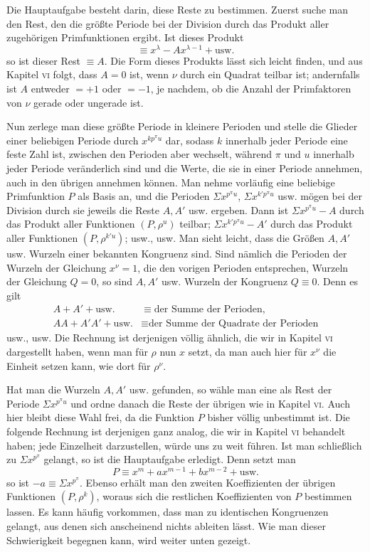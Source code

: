 Die Hauptaufgabe besteht darin, diese Reste zu bestimmen. Zuerst suche man den Rest, den die größte Periode bei der Division durch das Produkt aller zugehörigen Primfunktionen ergibt. Ist dieses Produkt
\[
\equiv x^\lambda-Ax^{\lambda-1}+\text{usw.}
\]
so ist dieser Rest $\equiv A$. Die Form dieses Produkts lässt sich leicht finden, und aus Kapitel \textsc{vi} folgt, dass $A=0$ ist, wenn $\nu$ durch ein Quadrat teilbar ist; andernfalls ist $A$ entweder $=+1$ oder $=-1$, je nachdem, ob die Anzahl der Primfaktoren von $\nu$ gerade oder ungerade ist.

Nun zerlege man diese größte Periode in kleinere Perioden und stelle die Glieder einer beliebigen Periode durch $x^{kp^\pi u}$ dar, sodass $k$ innerhalb jeder Periode eine
feste Zahl ist, zwischen den Perioden aber wechselt, während $\pi$ und $u$ innerhalb jeder Periode veränderlich sind und die Werte, die sie in einer Periode annehmen, auch in den übrigen annehmen können. Man nehme vorläufig eine beliebige Primfunktion $P$ als Basis an, und die Perioden $\Sigma x^{p^\pi u}$, $\Sigma x^{k'p^\pi u}$ usw. mögen bei der Division durch sie jeweils die Reste $A,A'$ usw. ergeben. Dann ist $\Sigma x^{p^\pi u}-A$ durch das Produkt aller Funktionen $(P,\rho^u)$ teilbar; $\Sigma x^{k'p^\pi u}-A'$ durch das Produkt aller Funktionen $(P,\rho^{k'u})$; usw., usw. Man sieht leicht, dass die Größen $A,A'$ usw. Wurzeln einer bekannten Kongruenz sind. Sind nämlich die Perioden der Wurzeln der Gleichung $x^\nu=1$, die den vorigen Perioden entsprechen, Wurzeln der Gleichung $Q=0$, so sind $A,A'$ usw. Wurzeln der Kongruenz $Q\equiv0$. Denn es gilt
\[
\begin{aligned}
A+A'+\text{usw.}&\equiv\text{der Summe der Perioden},\\
AA+A'A'+\text{usw.}&\equiv\text{der Summe der Quadrate der Perioden}
\end{aligned}
\]
usw., usw. Die Rechnung ist derjenigen völlig ähnlich, die wir in Kapitel \textsc{vi} dargestellt haben, wenn man für $\rho$ nun $x$ setzt, da man auch hier für $x^\nu$ die Einheit setzen kann, wie dort für $\rho^\nu$.

Hat man die Wurzeln $A,A'$ usw. gefunden, so wähle man eine als Rest der Periode $\Sigma x^{p^\pi u}$ und ordne danach die Reste der übrigen wie in Kapitel \textsc{vi}. Auch hier bleibt diese Wahl frei, da die Funktion $P$ bisher völlig unbestimmt ist. Die folgende Rechnung ist derjenigen ganz analog, die wir in Kapitel \textsc{vi} behandelt haben; jede Einzelheit darzustellen, würde uns zu weit führen. Ist man schließlich zu $\Sigma x^{p^\pi}$ gelangt, so ist die Hauptaufgabe erledigt. Denn setzt man
\[
P\equiv x^m+ax^{m-1}+bx^{m-2}+\text{usw.}
\]
so ist $-a\equiv\Sigma x^{p^\pi}$. Ebenso erhält man den zweiten Koeffizienten der übrigen Funktionen $(P,\rho^k)$, woraus sich die restlichen Koeffizienten von $P$ bestimmen lassen. Es kann häufig vorkommen, dass man zu identischen Kongruenzen gelangt, aus denen sich anscheinend nichts ableiten lässt. Wie man dieser Schwierigkeit begegnen kann, wird weiter unten gezeigt.

